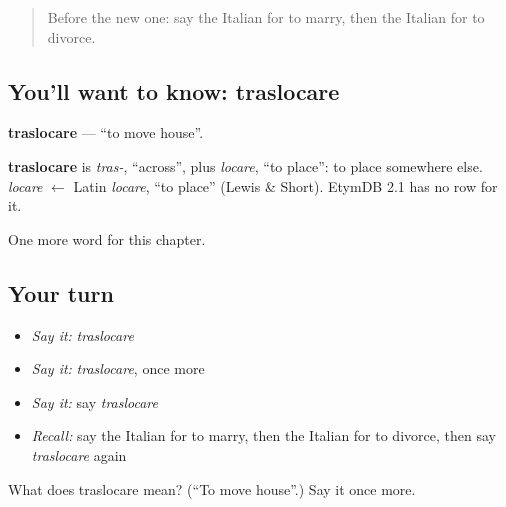 \label{lesson:IT-C207-traslocare}



\begin{quote}
Before the new one: say the Italian for to marry, then the Italian for to divorce.
\end{quote}

\subsection*{You'll want to know: traslocare}
\textbf{traslocare} — \textquotedblleft{}to move house\textquotedblright{}.

\begin{cousinweb}
\textbf{traslocare} is \emph{tras-}, \textquotedblleft{}across\textquotedblright{}, plus \emph{locare}, \textquotedblleft{}to place\textquotedblright{}: to place somewhere else. \emph{locare} $\leftarrow$ Latin \emph{locare}, \textquotedblleft{}to place\textquotedblright{} (Lewis \& Short). EtymDB 2.1 has no row for it.
\end{cousinweb}

\begin{grammarlens}[title={What you've built}]
One more word for this chapter.
\end{grammarlens}

\subsection*{Your turn}
\begin{itemize}
\raggedright
  \item \emph{Say it:} \emph{traslocare}
  \item \emph{Say it:} \emph{traslocare}, once more
  \item \emph{Say it:} say \emph{traslocare}
  \item \emph{Recall:} say the Italian for to marry, then the Italian for to divorce, then say \emph{traslocare} again
\end{itemize}

\begin{tcolorbox}[breakable,colback=teal!4,colframe=teal!35!black,title={Before you move on}]
What does traslocare mean? (\textquotedblleft{}To move house\textquotedblright{}.) Say it once more.
\end{tcolorbox}
